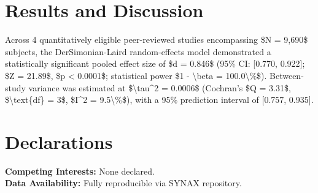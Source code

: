 \documentclass[11pt,a4paper,twocolumn]{article}
\begin{document}
\section{Results and Discussion}
Across 4 quantitatively eligible peer-reviewed studies encompassing \$N = 9,690\$ subjects, the DerSimonian-Laird random-effects model demonstrated a statistically significant pooled effect size of \$d = 0.846\$ (95\% CI: [0.770, 0.922]; \$Z = 21.89\$, \$p < 0.0001\$; statistical power \$1 - \textbackslash{}beta = 100.0\textbackslash{}\%\$). Between-study variance was estimated at \$\textbackslash{}tau\textasciicircum{}2 = 0.0006\$ (Cochran's \$Q = 3.31\$, \$\textbackslash{}text\{df\} = 3\$, \$I\textasciicircum{}2 = 9.5\textbackslash{}\%\$), with a 95\% prediction interval of [0.757, 0.935].

\section*{Declarations}
\noindent \textbf{Competing Interests:} None declared.\\
\textbf{Data Availability:} Fully reproducible via SYNAX repository.



\end{document}
